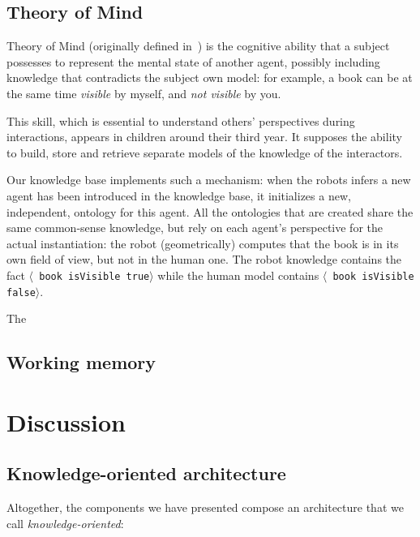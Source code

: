 \documentclass[letterpaper, 10 pt, conference]{ieeeconf}  %
\newcommand{\stmt}[1]{{\footnotesize \tt $\langle$ #1\relax$\rangle$}}
\begin{document}
\subsection{Theory of Mind}
\label{sect|tom}

Theory of Mind (originally defined in~\cite{Premack1978}) is the cognitive
ability that a subject possesses to represent the mental state of another
agent, possibly including knowledge that contradicts the subject own model: for
example, a book can be at the same time \emph{visible} by myself, and \emph{not
visible} by you.

This skill, which is essential to understand others' perspectives during
interactions, appears in children around their third year. It supposes the ability to build, store and retrieve separate models of the knowledge of the interactors.

Our knowledge base implements such a mechanism: when the robots infers a new
agent has been introduced in the knowledge base, it initializes a new,
independent, ontology for this agent. All the ontologies that are created share
the same common-sense knowledge, but rely on each agent's perspective for the
actual instantiation: the robot (geometrically) computes that the book is in
its own field of view, but not in the human one. The robot knowledge contains
the fact \stmt{book isVisible true} while the human model contains \stmt{book
isVisible false}.

The \cite{Warnier2012a}

\subsection{Working memory}

\section{Discussion}
\label{sect|conclusion}

\subsection{Knowledge-oriented architecture}

Altogether, the components we have presented compose an architecture that we
call \emph{knowledge-oriented}:
\end{document}
